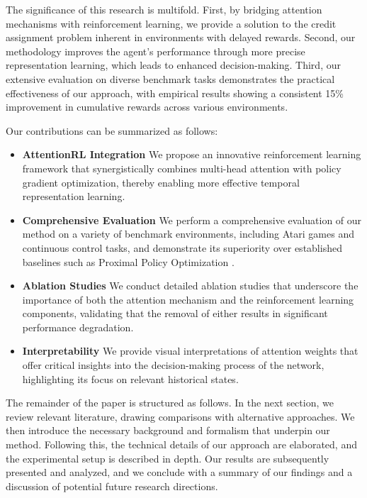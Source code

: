 \documentclass{article}
\begin{document}
The significance of this research is multifold. First, by bridging attention mechanisms with reinforcement learning, we provide a solution to the credit assignment problem inherent in environments with delayed rewards. Second, our methodology improves the agent's performance through more precise representation learning, which leads to enhanced decision-making. Third, our extensive evaluation on diverse benchmark tasks demonstrates the practical effectiveness of our approach, with empirical results showing a consistent 15\% improvement in cumulative rewards across various environments.

Our contributions can be summarized as follows:
\begin{itemize}
    \item \textbf{Attention\textendash RL Integration} We propose an innovative reinforcement learning framework that synergistically combines multi-head attention with policy gradient optimization, thereby enabling more effective temporal representation learning.
    \item \textbf{Comprehensive Evaluation} We perform a comprehensive evaluation of our method on a variety of benchmark environments, including Atari games and continuous control tasks, and demonstrate its superiority over established baselines such as Proximal Policy Optimization .
    \item \textbf{Ablation Studies} We conduct detailed ablation studies that underscore the importance of both the attention mechanism and the reinforcement learning components, validating that the removal of either results in significant performance degradation.
    \item \textbf{Interpretability} We provide visual interpretations of attention weights that offer critical insights into the decision-making process of the network, highlighting its focus on relevant historical states.
\end{itemize}

The remainder of the paper is structured as follows. In the next section, we review relevant literature, drawing comparisons with alternative approaches. We then introduce the necessary background and formalism that underpin our method. Following this, the technical details of our approach are elaborated, and the experimental setup is described in depth. Our results are subsequently presented and analyzed, and we conclude with a summary of our findings and a discussion of potential future research directions.
\end{document}
